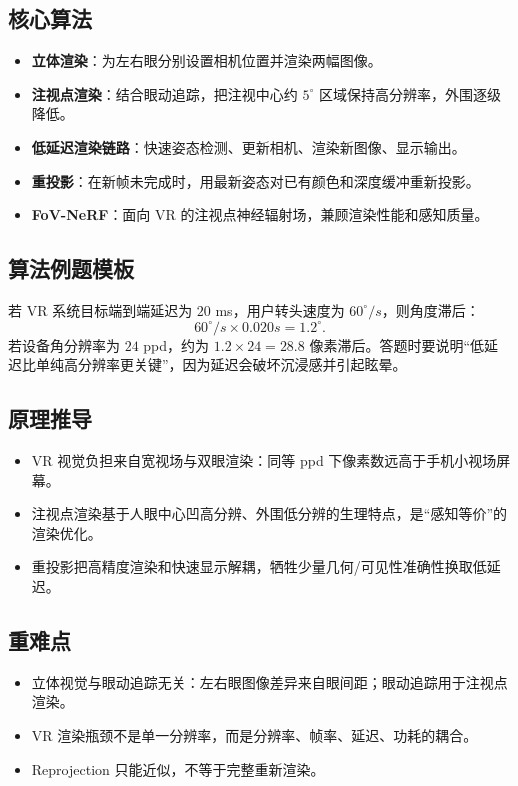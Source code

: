 \documentclass[UTF8,zihao=-4,scheme=chinese,fontset=fandol]{ctexart}
\newcommand{\key}[1]{\textbf{#1}}
\begin{document}
\subsection{核心算法}
\begin{itemize}
  \item \key{立体渲染}：为左右眼分别设置相机位置并渲染两幅图像。
  \item \key{注视点渲染}：结合眼动追踪，把注视中心约 $5^\circ$ 区域保持高分辨率，外围逐级降低。
  \item \key{低延迟渲染链路}：快速姿态检测、更新相机、渲染新图像、显示输出。
  \item \key{重投影}：在新帧未完成时，用最新姿态对已有颜色和深度缓冲重新投影。
  \item \key{FoV-NeRF}：面向 VR 的注视点神经辐射场，兼顾渲染性能和感知质量。
\end{itemize}

\subsection{算法例题模板}
若 VR 系统目标端到端延迟为 $20$ ms，用户转头速度为 $60^\circ/s$，则角度滞后：
\[
60^\circ/s\times0.020s=1.2^\circ.
\]
若设备角分辨率为 $24$ ppd，约为 $1.2\times24=28.8$ 像素滞后。答题时要说明“低延迟比单纯高分辨率更关键”，因为延迟会破坏沉浸感并引起眩晕。

\subsection{原理推导}
\begin{itemize}
  \item VR 视觉负担来自宽视场与双眼渲染：同等 ppd 下像素数远高于手机小视场屏幕。
  \item 注视点渲染基于人眼中心凹高分辨、外围低分辨的生理特点，是“感知等价”的渲染优化。
  \item 重投影把高精度渲染和快速显示解耦，牺牲少量几何/可见性准确性换取低延迟。
\end{itemize}

\subsection{重难点}
\begin{itemize}
  \item 立体视觉与眼动追踪无关：左右眼图像差异来自眼间距；眼动追踪用于注视点渲染。
  \item VR 渲染瓶颈不是单一分辨率，而是分辨率、帧率、延迟、功耗的耦合。
  \item Reprojection 只能近似，不等于完整重新渲染。
\end{itemize}
\end{document}
